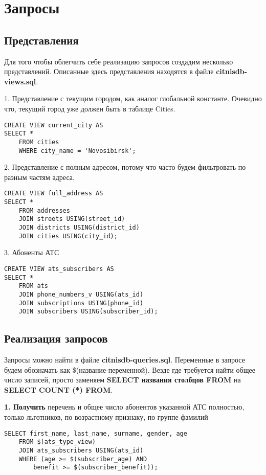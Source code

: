 \documentclass{report}
\begin{document}
\chapter{Запросы}

\section{Представления}

Для того чтобы облегчить себе реализацию запросов создадим несколько
представлений. Описанные здесь представления находятся в файле 
\textbf{citnisdb-views.sql}.

1. Представление с текущим городом, как аналог глобальной константе.
Очевидно что, текущий город уже должен быть в таблице Cities.

\begin{lstlisting}
CREATE VIEW current_city AS
SELECT *
    FROM cities 
    WHERE city_name = 'Novosibirsk'; 
\end{lstlisting}

2. Представление с полным адресом, потому что часто будем фильтровать
по разным частям адреса.

\begin{lstlisting}
CREATE VIEW full_address AS
SELECT *
    FROM addresses 
    JOIN streets USING(street_id)
    JOIN districts USING(district_id)
    JOIN cities USING(city_id);
\end{lstlisting}

3. Абоненты АТС
\begin{lstlisting}
CREATE VIEW ats_subscribers AS
SELECT *
    FROM ats
    JOIN phone_numbers_v USING(ats_id)
    JOIN subscriptions USING(phone_id)
    JOIN subscribers USING(subscriber_id);
\end{lstlisting}

\section{Реализация запросов}

Запросы можно найти в файле \textbf{citnisdb-queries.sql}.
Переменные в запросе будем обозначать как \$(название-переменной). 
Везде где требуется найти общее число записей, просто заменяем
\textbf{SELECT названия столбцов FROM} на 
\textbf{SELECT COUNT (*) FROM}.

\textbf{1. Получить} перечень и общее число абонентов указанной АТС полностью, 
только льготников, по возрастному признаку, по группе фамилий

\begin{lstlisting}
SELECT first_name, last_name, surname, gender, age 
    FROM $(ats_type_view) 
    JOIN ats_subscribers USING(ats_id)
    WHERE (age >= $(subscriber_age) AND
        benefit >= $(subscriber_benefit));
\end{lstlisting}
\end{document}
